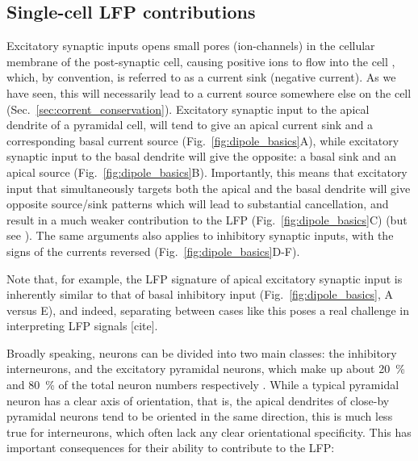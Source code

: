 \documentclass[preprint,11pt,authoryear]{elsarticle}
\begin{document}
\subsection*{Single-cell LFP contributions}
Excitatory synaptic inputs opens small pores (ion-channels) in the cellular membrane of the post-synaptic cell, causing positive ions to flow into the cell \citep{Kandel2012}, which, by convention, is referred to as a current sink (negative current). As we have seen, this will necessarily lead to a current source somewhere else on the cell (Sec.~\ref{sec:corrent_conservation}).  
Excitatory synaptic input to the apical dendrite of a pyramidal cell, will tend to give an apical current sink and a corresponding basal current source (Fig.~\ref{fig:dipole_basics}A), while excitatory synaptic input to the basal dendrite will give the opposite: a basal sink and an apical source (Fig.~\ref{fig:dipole_basics}B). Importantly, this means that excitatory input that simultaneously targets both the apical and the basal dendrite will give opposite source/sink patterns which will lead to substantial cancellation, and result in a much weaker contribution to the LFP (Fig.~\ref{fig:dipole_basics}C) (but see \cite{Ness2018}).
The same arguments also applies to inhibitory synaptic inputs, with the signs of the currents reversed (Fig.~\ref{fig:dipole_basics}D-F). 

Note that, for example, the LFP signature of apical excitatory synaptic input is inherently similar to that of basal inhibitory input (Fig.~\ref{fig:dipole_basics}, A versus E), and indeed, separating between cases like this poses a real challenge in interpreting LFP signals [cite]. 

Broadly speaking, neurons can be divided into two main classes: the inhibitory interneurons, and the excitatory pyramidal neurons, which make up about 20~\% and 80~\% of the total neuron numbers respectively \citep{Kandel2012}. While a typical pyramidal neuron has a clear axis of orientation, that is, the apical dendrites of close-by pyramidal neurons tend to be oriented in the same direction, this is much less true for interneurons, which often lack any clear orientational specificity. This has important consequences for their ability to contribute to the LFP: 
\end{document}
